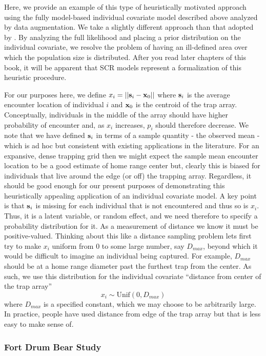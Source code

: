 Here, we provide an example of this type of heuristically motivated
approach using the fully model-based individual covariate model
described above analyzed by data augmentation. We take a slightly
different approach than that adopted by
\citet{boulanger_mclellan:2001}. By analyzing the full likelihood and
placing a prior distribution on the individual covariate, we resolve
the problem of having an ill-defined area over which the population
size is distributed. After you read later chapters of this book, it
will be apparent that SCR models represent a formalization of this
heuristic procedure.

For our purposes here, we define $x_{i} = ||{\bf s}_{i} - {\bf
  x}_{0}||$ where ${\bf s}_{i}$
is the average encounter location of individual $i$ and ${\bf x}_{0}$ is the
centroid of the trap array.  Conceptually, individuals in the middle
of the array should have higher probability of encounter and, as
$x_{i}$ increases, $p_{i}$ should therefore decrease. We note that we
have defined ${\bf s}_{i}$ in terms of a sample quantity - the observed mean
- which is ad hoc but consistent with existing applications in the literature.
For an expansive, dense trapping grid then we might expect the sample mean
encounter location to be a good estimate of home range center but,
clearly this is biased for individuals that live around the edge (or
off) the trapping array. Regardless, it should be good enough for our
present purposes of demonstrating this heuristically appealing
application of an individual covariate model. A key point is that
${\bf s}_{i}$ is missing for each individual that is not encountered and
thus so is $x_{i}$. Thus,
it is a latent variable, or random effect, and we need therefore to
specify a probability distribution for it.
As a measurement of distance we know it must be
positive-valued. Thinking about this like a distance sampling problem
lets first try to make $x_{i}$ uniform from $0$ to some large number,
say $D_{max}$, beyond which it would be difficult to imagine an
individual being captured. For example, $D_{max}$ should be at a home
range diameter past the furthest trap from the center.
As such, we use this distribution for the individual covariate
``distance from center of the trap array''
\[
 x_{i} \sim \mbox{Unif}(0,D_{max})
\]
where $D_{max}$ is a specified constant, which we may choose to be
arbitrarily large.  In practice, people have
used distance from edge of the trap array but that is less easy to
make sense of.


\subsubsection{Fort Drum Bear Study}


